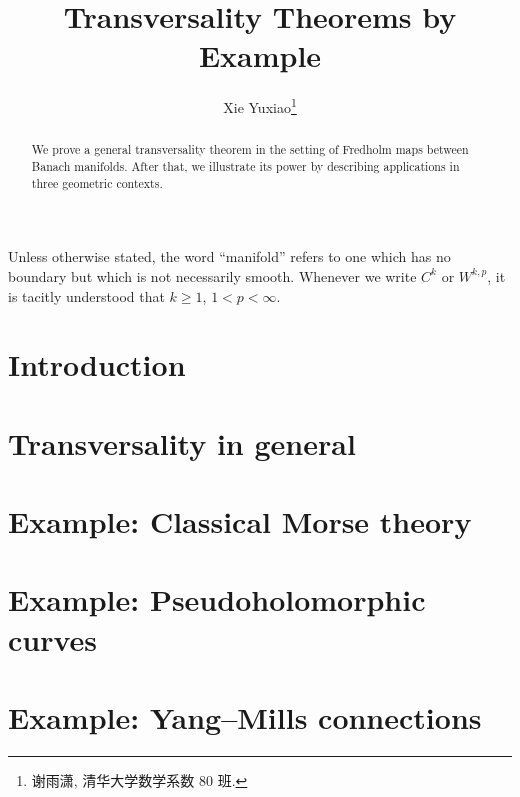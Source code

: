 \documentclass[twoside]{article}
\begin{document}
\title{Transversality Theorems by Example}
\author{Xie Yuxiao\footnote{谢雨潇, 清华大学数学系数 80 班.}}

\begin{abstract}
	We prove a general transversality theorem in the setting of Fredholm 
	maps between Banach manifolds. After that, we illustrate its power by
	describing applications in three geometric contexts.
\end{abstract}

\tableofcontents
\bigskip

\begin{convention}
	Unless otherwise stated, the word ``manifold'' refers to one which 
	has no boundary but which is not necessarily smooth. 
	Whenever we write $C^k$ or $W^{k, p}$, it is tacitly understood 
	that $k \geq 1$, $1 < p < \infty$.
\end{convention}

\section{Introduction}



\section{Transversality in general}



\section{Example: Classical Morse theory}



\section{Example: Pseudoholomorphic curves}



\section{Example: Yang--Mills connections}



\printbibliography
\end{document}
